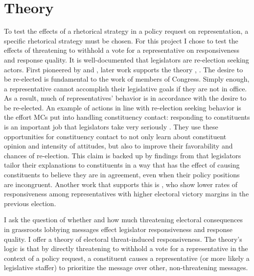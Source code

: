 \documentclass[12pt]{article}\usepackage[]{graphicx}\usepackage[]{color}
\begin{document}
\section{Theory}
To test the effects of a rhetorical strategy in a policy request on representation, a specific rhetorical strategy must be chosen. For this project I chose to test the effects of threatening to withhold a vote for a representative on responsiveness and response quality.
It is well-documented that legislators are re-election seeking actors. First pioneered by \cite{mayhew1974congress} and \cite{Fenno:1973aa}, later work supports the theory \citep{Fiorina:1974aa}, \citep{Kingdon:1989aa}. The desire to be re-elected is fundamental to the work of members of Congress. Simply enough, a representative cannot accomplish their legislative goals if they are not in office. As a result, much of representatives' behavior is in accordance with the desire to be re-elected. An example of actions in line with re-election seeking behavior is the effort MCs put into handling constituency contact: responding to constituents is an important job that legislators take very seriously \citep{fenno1978home, Frantzich:1986aa, CMF:2011aa}. They use these opportunities for constituency contact to not only learn about constituent opinion and intensity of attitudes, but also to improve their favorability and chances of re-election. This claim is backed up by findings from \cite{Grose:2015aa} that legislators tailor their explanations to constituents in a way that has the effect of causing constituents to believe they are in agreement, even when their policy positions are incongruent. Another work that supports this is \cite{Dropp-Peskowitz2012a}, who show lower rates of responsiveness among representatives with higher electoral victory margins in the previous election.

I ask the question of whether and how much threatening electoral consequences in grassroots lobbying messages effect legislator responsiveness and response quality. I offer a theory of electoral threat-induced responsiveness. The theory's logic is that by directly threatening to withhold a vote for a representative in the context of a policy request, a constituent causes a representative (or more likely a legislative staffer) to prioritize the message over other, non-threatening messages.

\end{document}
